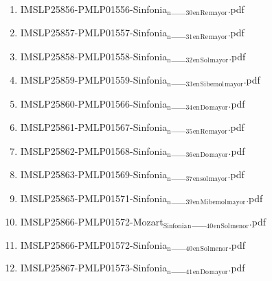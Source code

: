 \documentclass[11pt]{article}
\begin{document}
\begin{enumerate}
\begin{enumerate}
\item IMSLP25856-PMLP01556-Sinfonia$_{\text{n}}$\_\_$_{\text{30}}$$_{\text{en}}$$_{\text{Re}}$$_{\text{mayor}}$.pdf
\label{sec-1-1-1-1-44-49-11-31}

\item IMSLP25857-PMLP01557-Sinfonia$_{\text{n}}$\_\_$_{\text{31}}$$_{\text{en}}$$_{\text{Re}}$$_{\text{mayor}}$.pdf
\label{sec-1-1-1-1-44-49-11-32}

\item IMSLP25858-PMLP01558-Sinfonia$_{\text{n}}$\_\_$_{\text{32}}$$_{\text{en}}$$_{\text{Sol}}$$_{\text{mayor}}$.pdf
\label{sec-1-1-1-1-44-49-11-33}

\item IMSLP25859-PMLP01559-Sinfonia$_{\text{n}}$\_\_$_{\text{33}}$$_{\text{en}}$$_{\text{Si}}$$_{\text{bemol}}$$_{\text{mayor}}$.pdf
\label{sec-1-1-1-1-44-49-11-34}

\item IMSLP25860-PMLP01566-Sinfonia$_{\text{n}}$\_\_$_{\text{34}}$$_{\text{en}}$$_{\text{Do}}$$_{\text{mayor}}$.pdf
\label{sec-1-1-1-1-44-49-11-35}

\item IMSLP25861-PMLP01567-Sinfonia$_{\text{n}}$\_\_$_{\text{35}}$$_{\text{en}}$$_{\text{Re}}$$_{\text{mayor}}$.pdf
\label{sec-1-1-1-1-44-49-11-36}

\item IMSLP25862-PMLP01568-Sinfonia$_{\text{n}}$\_\_$_{\text{36}}$$_{\text{en}}$$_{\text{Do}}$$_{\text{mayor}}$.pdf
\label{sec-1-1-1-1-44-49-11-37}

\item IMSLP25863-PMLP01569-Sinfonia$_{\text{n}}$\_\_$_{\text{37}}$$_{\text{en}}$$_{\text{sol}}$$_{\text{mayor}}$.pdf
\label{sec-1-1-1-1-44-49-11-38}

\item IMSLP25865-PMLP01571-Sinfonia$_{\text{n}}$\_\_$_{\text{39}}$$_{\text{en}}$$_{\text{Mi}}$$_{\text{bemol}}$$_{\text{mayor}}$.pdf
\label{sec-1-1-1-1-44-49-11-39}

\item IMSLP25866-PMLP01572-Mozart$_{\text{Sinfonia}}$$_{\text{n}}$\_\_$_{\text{40}}$$_{\text{en}}$$_{\text{Sol}}$$_{\text{menor}}$.pdf
\label{sec-1-1-1-1-44-49-11-40}

\item IMSLP25866-PMLP01572-Sinfonia$_{\text{n}}$\_\_$_{\text{40}}$$_{\text{en}}$$_{\text{Sol}}$$_{\text{menor}}$.pdf
\label{sec-1-1-1-1-44-49-11-41}

\item IMSLP25867-PMLP01573-Sinfonia$_{\text{n}}$\_\_$_{\text{41}}$$_{\text{en}}$$_{\text{Do}}$$_{\text{mayor}}$.pdf
\label{sec-1-1-1-1-44-49-11-42}


\end{enumerate}
\end{enumerate}
\end{document}

